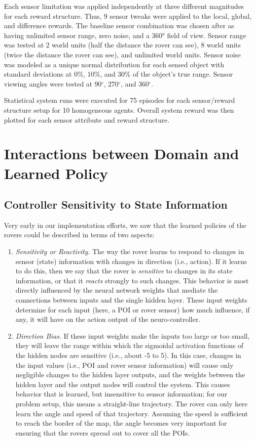 \documentclass[letterpaper, 10 pt, conference]{ieeeconf}  %
\begin{document}
Each sensor limitation was applied independently at three different
magnitudes for each reward structure.  Thus, 9 sensor tweaks were applied to
the local, global, and difference rewards. The baseline sensor combination was chosen after \cite{agogino2008analyzing} as having
unlimited sensor range, zero noise, and a 360° field of view. Sensor
range was tested at 2 world units (half the distance the rover can see), 8 world units (twice the distance 
the rover can see), and unlimited world
units. Sensor noise was modeled as a unique normal distribution for
each sensed object with standard deviations at 0\%, 10\%, and 30\% of the
object’s true range. Sensor viewing angles were tested at 90$^{\circ}$, 270$^{\circ}$,
and 360$^{\circ}$.

Statistical system runs were executed for 75 episodes for each
sensor/reward structure setup for 10 homogeneous agents.  Overall system reward was then plotted for each
sensor attribute and reward structure.


\section{Interactions between Domain and Learned Policy}
\subsection{Controller Sensitivity to State Information}
Very early in our implementation efforts, we saw that the learned policies of the rovers could be described in terms of two aspects:

\begin{enumerate}
\item \emph{Sensitivity or Reactivity.} The way the rover learns to respond to changes in sensor (state) information with changes in direction (i.e., action). If it learns to do this, then we say that the rover is \emph{sensitive} to changes in its state information, or that it \emph{reacts} strongly to such changes. This behavior is most directly influenced by the neural network weights that mediate the connections between inputs and the single hidden layer. These input weights determine for each input (here, a POI or rover sensor) how much influence, if any, it will have on the action output of the neuro-controller. 

\item \emph{Direction Bias.} If these input weights make the inputs too large or too small, they will leave the range within which the sigmoidal activation functions of the hidden nodes are sensitive (i.e., about -5 to 5). In this case, changes in the input values (i.e., POI and rover sensor information) will cause only negligible changes to the hidden layer outputs, and the weights between the hidden layer and the output nodes will control the system. This causes behavior that is learned, but insensitive to sensor information; for our problem setup, this means a straight-line trajectory. The rover can only here learn the angle and speed of that trajectory. Assuming the speed is sufficient to reach the border of the map, the angle becomes very important for ensuring that the rovers spread out to cover all the POIs. 
\end{enumerate}
\end{document}
